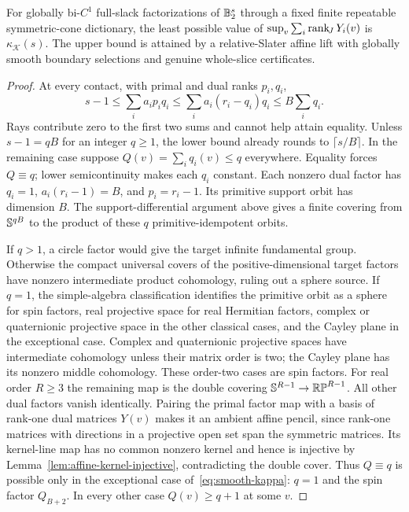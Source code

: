 \begin{theorem}\label{thm:smooth-rank}
For globally bi-$C^1$ full-slack factorizations of $\mathbb B_2^s$ through a
fixed finite repeatable symmetric-cone dictionary, the least possible
value of $\sup_v\sum_i\operatorname{rank}_{\!J} Y_i(v)$ is $\kappa_{\mathscr K}(s)$.
The upper bound is attained by a relative-Slater affine lift with globally
smooth boundary selections and genuine whole-slice certificates.
\end{theorem}
\begin{proof}
At every contact, with primal and dual ranks $p_i,q_i$,
\[
 s-1\leq\sum_i a_ip_iq_i
 \leq\sum_i a_i(r_i-q_i)q_i
 \leq B\sum_iq_i.
\]
Rays contribute zero to the first two sums and cannot help attain
equality. Unless $s-1=qB$ for an integer $q\geq1$, the lower bound
already rounds to $\lceil s/B\rceil$. In the remaining case suppose
$Q(v)=\sum_iq_i(v)\leq q$ everywhere. Equality forces $Q\equiv q$;
lower semicontinuity makes each $q_i$ constant. Each nonzero dual factor
has $q_i=1$, $a_i(r_i-1)=B$, and $p_i=r_i-1$. Its primitive support
orbit has dimension $B$. The support-differential argument above gives
a finite covering from $\mathbb S^{qB}$ to the product of these $q$
primitive-idempotent orbits.

If $q>1$, a circle factor would give the target infinite fundamental
group. Otherwise the compact universal
covers of the positive-dimensional target factors
have nonzero intermediate product cohomology, ruling out a sphere
source. If $q=1$, the simple-algebra classification identifies the
primitive orbit as a sphere for spin factors, real projective space for
real Hermitian factors, complex or quaternionic projective space in the
other classical cases, and the Cayley plane in the exceptional case.
Complex and quaternionic projective spaces have intermediate cohomology
unless their matrix order is two; the Cayley plane has its nonzero
middle cohomology. These order-two cases are spin factors. For real
order $R\geq3$ the remaining map is the double covering
$\mathbb S^{R-1}\to\mathbb{RP}^{R-1}$. All other dual factors vanish
identically. Pairing the primal factor map with a basis of rank-one
dual matrices $Y(v)$ makes it an ambient affine pencil, since rank-one
matrices with directions in a projective open set span the symmetric
matrices. Its kernel-line map has no common nonzero kernel and hence
is injective by Lemma~\ref{lem:affine-kernel-injective}, contradicting
the double cover. Thus $Q\equiv q$ is possible only in the exceptional
case of~\eqref{eq:smooth-kappa}: $q=1$ and the spin factor $Q_{B+2}$.
In every other case $Q(v)\geq q+1$ at some $v$.


\end{proof}
